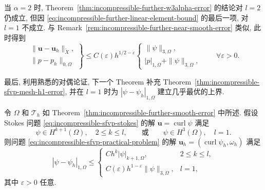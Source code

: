 \begin{Remark}\label{rem:incompressible-further-alpha-two}
当 $\alpha=2$ 时,
Theorem~\ref{thm:incompressible-further-w3alpha-error}
的结论对 $l=2$ 仍成立, 但因
\eqref{eq:incompressible-further-linear-element-bound}
的最后一项, 对 $l=1$ 不成立.
与 Remark~\ref{rem:incompressible-further-near-smooth-error} 类似,
此时得到
\[
\left.
\begin{aligned}
\|\mathbf u-\mathbf u_h\|_{\widetilde X},\\
\|p-p_h\|_{0,\Omega}
\end{aligned}
\right\}
\leq C(\varepsilon)h^{1/2-\varepsilon}
\begin{cases}
\|\psi\|_{3,\Omega},\\
|p|_{1,\Omega}+\|\psi\|_{3,\Omega},
\end{cases}
\qquad\forall\varepsilon>0.
\]
\end{Remark}

最后, 利用熟悉的对偶论证, 下一个 Theorem
补充 Theorem~\ref{thm:incompressible-sfvp-mesh-h1-error},
并在 $l=1$ 时为 $|\psi-\psi_h|_{1,\Omega}$
建立几乎最优的上界.

\begin{Theorem}\label{thm:incompressible-further-h1-error}
令 $\Omega$ 和 $\mathcal T_h$ 如
Theorem~\ref{thm:incompressible-further-smooth-error} 中所述.
假设 Stokes 问题 \eqref{eq:incompressible-sfvp-stokes}
的解 $\mathbf u=\operatorname{curl}\psi$ 满足
\[
\psi\in H^{k+1}(\Omega),\quad 2\leq k\leq l,
\qquad\text{或}\qquad
\psi\in H^3(\Omega),\quad l=1.
\]
则问题 \eqref{eq:incompressible-sfvp-practical-problem}
的解 $\mathbf u_h=(\operatorname{curl}\psi_h,\omega_h)$ 满足
\begin{equation}\label{eq:incompressible-further-h1-error}
|\psi-\psi_h|_{1,\Omega}
\leq
\begin{cases}
Ch^k|\psi|_{k+1,\Omega},&2\leq k\leq l,\\
C(\varepsilon)h^{1-\varepsilon}\|\psi\|_{3,\Omega},&l=1,
\end{cases}
\end{equation}
其中 $\varepsilon>0$ 任意.
\end{Theorem}

